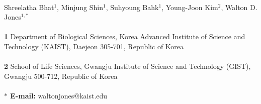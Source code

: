 \begin{flushleft}
\\
Shreelatha Bhat$^{1}$, 
Minjung Shin$^{1}$, 
Suhyoung Bahk$^{1}$, 
Young-Joon Kim$^{2}$, 
Walton D. Jones$^{1,\ast}$
\\
\\
{\bf 1} Department of Biological Sciences, Korea Advanced Institute of Science and Technology (KAIST), Daejeon 305-701, Republic of Korea
\\
\\
{\bf 2} School of Life Sciences, Gwangju Institute of Science and Technology (GIST), Gwangju 500-712, Republic of Korea
\\
\\
{\bf $\ast$ E-mail:} waltonjones@kaist.edu
\end{flushleft}